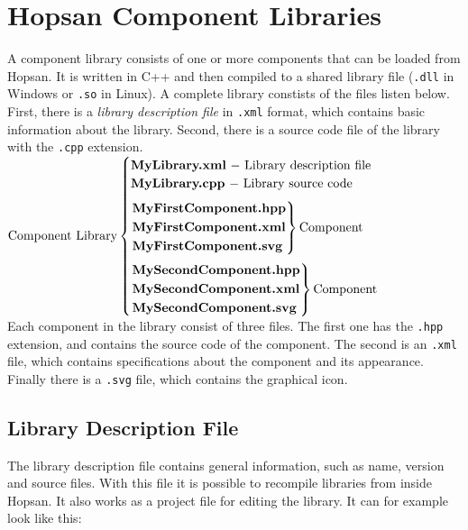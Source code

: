 \documentclass[a4paper,pdftex]{article}
\begin{document}
\section*{Hopsan Component Libraries}
A component library consists of one or more components that can be loaded from Hopsan. It is written in C++ and then compiled to a shared library file (\texttt{.dll} in Windows or \texttt{.so} in Linux). A complete library constists of the files listen below. First, there is a \textit{library description file} in \texttt{.xml} format, which contains basic information about the library. Second, there is a source code file of the library with the \texttt{.cpp} extension.\vspace{10pt}\\
$\mathrm{Component\ Library} \begin{cases}
\mathtt{\textbf{MyLibrary.xml}} \mathrm{\ -\ Library\ description\ file}\\
\mathtt{\textbf{MyLibrary.cpp}} \mathrm{\ -\ Library\ source\ code}\vspace{7pt} \\ 
\begin{rcases}
  \mathtt{\textbf{MyFirstComponent.hpp}} \\
  \mathtt{\textbf{MyFirstComponent.xml}} \\
  \mathtt{\textbf{MyFirstComponent.svg}}
\end{rcases} \mathrm{Component}\vspace{7pt} \\
\begin{rcases}
  \mathtt{\textbf{MySecondComponent.hpp}} \\
  \mathtt{\textbf{MySecondComponent.xml}} \\
  \mathtt{\textbf{MySecondComponent.svg}}
\end{rcases} \mathrm{Component} \\
\end{cases}$
\vspace{10pt}\\
Each component in the library consist of three files. The first one has the \texttt{.hpp} extension, and contains the source code of the component. The second is an \texttt{.xml} file, which contains specifications about the component and its appearance. Finally there is a \texttt{.svg} file, which contains the graphical icon.

\subsection*{Library Description File}
The library description file contains general information, such as name, version and source files.
With this file it is possible to recompile libraries from inside Hopsan.
It also works as a project file for editing the library.
It can for example look like this:
\end{document}
